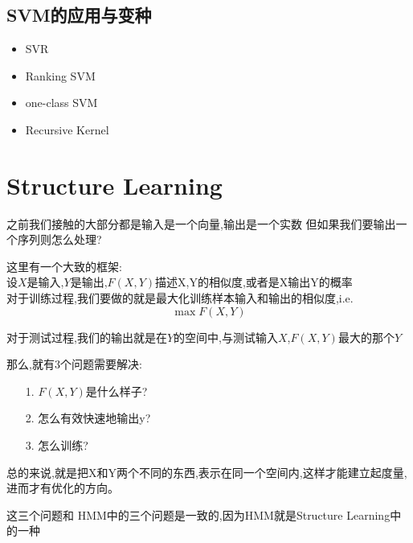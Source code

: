 \documentclass[UTF8,a4paper]{ctexart}
\begin{document}
        {\color{red}}

        \subsection{SVM的应用与变种}
        \begin{itemize}
            \item SVR
            \item Ranking SVM
            \item one-class SVM
            \item Recursive Kernel
        \end{itemize}

    \section{Structure Learning}
    之前我们接触的大部分都是输入是一个向量,输出是一个实数
    但如果我们要输出一个序列则怎么处理?

    这里有一个大致的框架:\\
    设$X$是输入,$Y$是输出,$F(X,Y)$描述X,Y的相似度,或者是X输出Y的概率\\
    对于训练过程,我们要做的就是最大化训练样本输入和输出的相似度,i.e.
    \begin{equation}
        \max F(X,Y)
    \end{equation}

    对于测试过程,我们的输出就是在$Y$的空间中,与测试输入$X$,$F(X,Y)$最大的那个$Y$

    那么,就有3个问题需要解决:
    \begin{itemize}
        \item [1. ] $F(X,Y)$是什么样子?
        \item [2. ] 怎么有效快速地输出y?
        \item [3. ] 怎么训练?
    \end{itemize}

    {\color{blue} 总的来说,就是把X和Y两个不同的东西,表示在同一个空间内,这样才能建立起度量,进而才有优化的方向。}

    {\color{blue} 这三个问题和 HMM中的三个问题是一致的,因为HMM就是Structure Learning中的一种}
\end{document}
